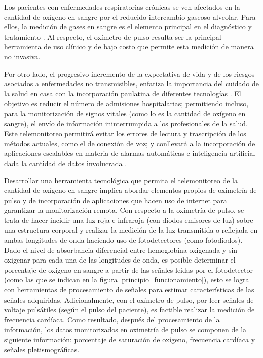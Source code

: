 \documentclass[journal]{IEEEtran}
\begin{document}
Los pacientes con enfermedades respiratorias crónicas se ven afectados en la cantidad de oxígeno en sangre por el reducido intercambio gaseoso alveolar. Para ellos, la medición de gases en sangre es el elemento principal en el diagnóstico y tratamiento \cite{A_webster_spo2}.  Al respecto, el oxímetro de pulso resulta ser la principal herramienta de uso clínico y de bajo costo que permite esta medición de manera no invasiva.

Por otro lado, el progresivo incremento de la expectativa de vida y de los riesgos asociados a enfermedades no transmisibles, enfatiza la importancia del cuidado de la salud en casa con la incorporación paulatina de diferentes tecnologías \cite{A_webster_home_care}. El objetivo es reducir el número de admisiones hospitalarias; permitiendo incluso, para la monitorización de signos vitales (como lo es la cantidad de oxígeno en sangre), el envío de información ininterrumpida a los profesionales de la salud. Este telemonitoreo permitirá evitar los errores de lectura y trascripción de los métodos actuales, como el de conexión de voz; y conllevará  a la incorporación de aplicaciones escalables en materia de alarmas automáticas e inteligencia artificial dada la cantidad de datos involucrada \cite{A_telemedicina}.

Desarrollar una herramienta tecnológica que permita el telemonitoreo de la cantidad de oxígeno en sangre implica abordar elementos propios de oximetría de pulso y de incorporación de aplicaciones que hacen uso de internet para garantizar la monitorización remota. Con respecto a la oximetría de pulso, se trata de hacer incidir una luz roja e infraroja (con diodos emisores de luz) sobre una estructura corporal y realizar la medición de la luz transmitida o reflejada en ambas longitudes de onda haciendo uso de fotodetectores (como fotodiodos). Dado el nivel de absorbancia diferencial entre hemoglobina oxigenada y sin oxigenar para cada una de las longitudes de onda, es posible determinar el porcentaje de oxígeno en sangre a partir de las señales leidas por el fotodetector (como  las que se indican en la figura \ref{principio_funcionamiento}), esto se logra con herramientas de procesamiento de señales para estimar características de las señales adquiridas.  Adicionalmente, con el oxímetro de pulso, por leer señales de voltaje pulsátiles (según el pulso del paciente), es factible realizar la medición de frecuencia cardíaca. Como resultado, después del procesamiento de la información,  los datos monitorizados en oximetría de pulso se componen de la siguiente información: porcentaje de saturación de oxígeno, frecuencia cardíaca y señales pletismográficas.
\end{document}
